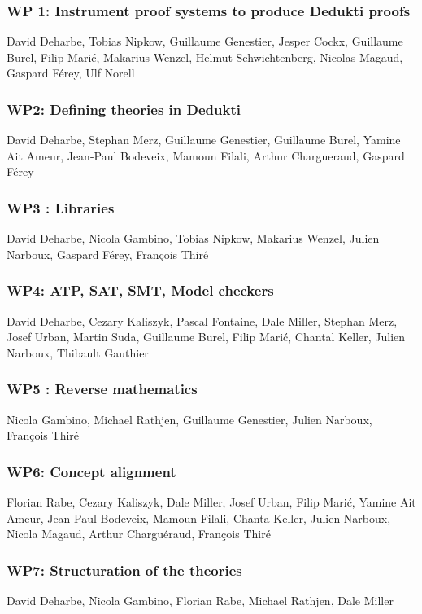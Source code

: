 \subsubsection{WP 1: Instrument proof systems to produce Dedukti proofs}

David Deharbe, Tobias Nipkow, Guillaume Genestier, Jesper
Cockx, Guillaume Burel, Filip Marić, Makarius Wenzel, Helmut
Schwichtenberg, Nicolas Magaud, Gaspard Férey, Ulf Norell



\subsubsection{WP2: Defining theories in Dedukti}

David Deharbe, Stephan Merz, Guillaume Genestier, Guillaume
Burel, Yamine Ait Ameur, Jean-Paul Bodeveix, Mamoun Filali, Arthur
Chargueraud, Gaspard Férey



\subsubsection{WP3 : Libraries}

David Deharbe, Nicola Gambino, Tobias Nipkow, Makarius Wenzel,
Julien Narboux, Gaspard Férey, François Thiré



\subsubsection{WP4: ATP, SAT, SMT, Model checkers}

David Deharbe,
Cezary Kaliszyk,
Pascal Fontaine, Dale Miller, Stephan Merz, Josef Urban, Martin Suda,
Guillaume Burel, Filip Marić, Chantal Keller, Julien Narboux, Thibault Gauthier



\subsubsection{WP5 : Reverse mathematics}

Nicola Gambino, Michael Rathjen, Guillaume Genestier, Julien Narboux,
François Thiré



\subsubsection{WP6: Concept alignment}

Florian Rabe, Cezary Kaliszyk, Dale Miller, Josef Urban,
Filip Marić, Yamine Ait Ameur, Jean-Paul Bodeveix, Mamoun Filali,
Chanta Keller, Julien Narboux, Nicola Magaud, Arthur Charguéraud,
François Thiré



\subsubsection{WP7: Structuration of the theories}

David Deharbe, Nicola Gambino, Florian Rabe, Michael Rathjen,
Dale Miller



